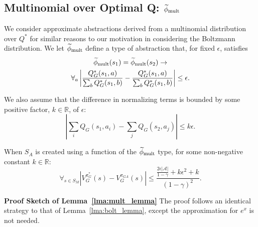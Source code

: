 \subsection{Multinomial over Optimal Q: $\epMu$}
\label{sec:mult}

We consider approximate abstractions derived from a multinomial distribution over $Q^*$ for similar reasons to our motivation in considering the Boltzmann distribution. 
\bdefn{$\epMu$}
We let $\epMu$ define a type of abstraction that, for fixed $\epsilon$, satisfies
\begin{multline}
\widetilde \phi_{\text{mult}}(s_1) = \widetilde \phi_{\text{mult}}(s_2) \rightarrow \\
\forall_{a} \left|\frac{Q_G^*(s_1,a)}{\sum_b Q_G^*(s_1,b)} - \frac{Q_G^*(s_1,a)}{\sum_b Q_G^*(s_1,b)}\right| \leq \epsilon.
\end{multline}
\edefn
{}

We also assume that the difference in normalizing terms is bounded by some positive factor, $k \in \mathbb{R}$, of $\epsilon$:
\begin{equation}
\left |\sum_i Q_G(s_1,a_i) - \sum_j Q_G(s_2,a_j) \right | \leq k\epsilon.
\end{equation}
\begin{lma} When $S_A$ is created using a function of the $\epMu$ type, for some non-negative constant $k \in \mathbb{R}$:
\begin{equation}
\forall_{s \in S_M} | V_G^{\pi^*_G}(s) - V_G^{\pi_{GA}}(s) | \leq \frac{\frac{2\epsilon|\mathcal{A}|}{1-\gamma} + k \epsilon^2 + k}{(1-\gamma)^2}.
\end{equation}
\label{lma:mult_lemma}
\end{lma}

{\bf Proof Sketch of Lemma~\ref{lma:mult_lemma}} The proof follows an identical strategy to that of Lemma~\ref{lma:bolt_lemma}, except the approximation for $e^x$ is not needed.


